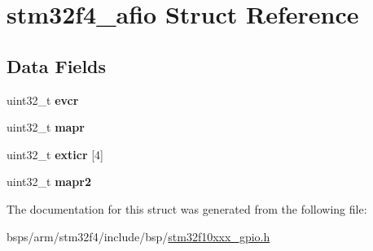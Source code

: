 \hypertarget{structstm32f4__afio}{}\section{stm32f4\+\_\+afio Struct Reference}
\label{structstm32f4__afio}
\subsection*{Data Fields}
\begin{DoxyCompactItemize}
\item 
\mbox{\label{structstm32f4__afio_a208b81e151f3b58e43334ea194f5a50c}} 
uint32\+\_\+t {\bfseries evcr}
\item 
\mbox{\label{structstm32f4__afio_a4fd548f752b34527f44117306474b098}} 
uint32\+\_\+t {\bfseries mapr}
\item 
\mbox{\label{structstm32f4__afio_ad86d9e20e4dd9d64a3806a840737b73a}} 
uint32\+\_\+t {\bfseries exticr} \mbox{[}4\mbox{]}
\item 
\mbox{\label{structstm32f4__afio_af76044f60e4fb70b03065dbd77b10e7c}} 
uint32\+\_\+t {\bfseries mapr2}
\end{DoxyCompactItemize}


The documentation for this struct was generated from the following file\+:\begin{DoxyCompactItemize}
\item 
bsps/arm/stm32f4/include/bsp/\mbox{\hyperlink{stm32f10xxx__gpio_8h}{stm32f10xxx\+\_\+gpio.\+h}}\end{DoxyCompactItemize}
